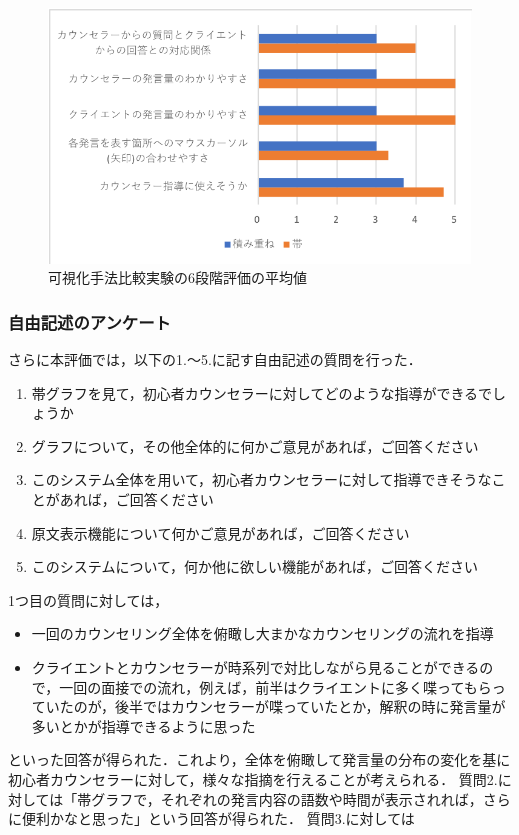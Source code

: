 \documentclass[shuuron]{kuee}
\begin{document}
\begin{figure}
  \begin{center}
    \includegraphics[width=\linewidth]{keijouAnketo.png}
  \end{center}
  \caption{可視化手法比較実験の6段階評価の平均値}
  \label{fig:keijouAnketo}
\end{figure}


\subsubsection{自由記述のアンケート}

さらに本評価では，以下の1.〜5.に記す自由記述の質問を行った．

\begin{enumerate}
  \item 帯グラフを見て，初心者カウンセラーに対してどのような指導ができるでしょうか
  \item グラフについて，その他全体的に何かご意見があれば，ご回答ください
  \item このシステム全体を用いて，初心者カウンセラーに対して指導できそうなことがあれば，ご回答ください
  \item 原文表示機能について何かご意見があれば，ご回答ください
  \item このシステムについて，何か他に欲しい機能があれば，ご回答ください
\end{enumerate}

1つ目の質問に対しては，
\begin{itemize}

  \item 一回のカウンセリング全体を俯瞰し大まかなカウンセリングの流れを指導
  \item クライエントとカウンセラーが時系列で対比しながら見ることができるので，一回の面接での流れ，例えば，前半はクライエントに多く喋ってもらっていたのが，後半ではカウンセラーが喋っていたとか，解釈の時に発言量が多いとかが指導できるように思った
\end{itemize}
といった回答が得られた．これより，全体を俯瞰して発言量の分布の変化を基に初心者カウンセラーに対して，様々な指摘を行えることが考えられる．
質問2.に対しては「帯グラフで，それぞれの発言内容の語数や時間が表示されれば，さらに便利かなと思った」という回答が得られた．
質問3.に対しては
\end{document}
